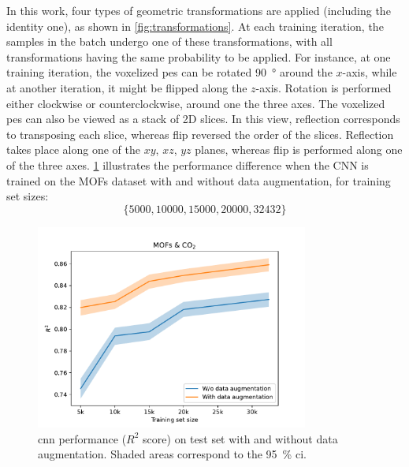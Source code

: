 In this work, four types of geometric transformations are applied (including the
identity one), as shown in \Figure{} \ref{fig:transformations}. At each training
iteration, the samples in the batch undergo one of these transformations, with
all transformations having the same probability to be applied. For instance, at
one training iteration, the voxelized \gls{pes} can be rotated
\SI{90}{\degree} around the $x$-axis, while at another iteration, it might be
flipped along the $z$-axis. Rotation is performed either
clockwise or counterclockwise, around one the three axes. The voxelized \gls{pes}
can also be viewed as a stack of 2D slices. In this view,
reflection corresponds to transposing each slice, whereas flip
reversed the order of the slices. Reflection takes place along one of the $xy$,
$xz$, $yz$ planes, whereas flip is performed along one of the three axes.
\Figure{} \ref{fig:data_augmentation} illustrates the performance difference when
the CNN is trained on the MOFs dataset with and without data augmentation, for
training set sizes:
\begin{equation}
	\{
		\num{5000}, \num{10000},
		\num{15000}, \num{20000},
		\num{32432}
	\}
\end{equation}

\begin{figure}
	\centering
	\includegraphics[width=0.8\textwidth]{fig/data_augmentation.pdf}
	\caption[Effect of data augmentation.]{\gls{cnn} performance ($R^2$ score)
	on test set with and without data augmentation. Shaded areas correspond to the \SI{95}{\percent}
	\gls{ci}.}
	\label{fig:data_augmentation}
\end{figure}
